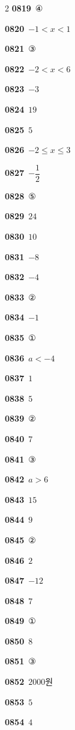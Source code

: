 \documentclass[10pt,a4paper]{article}
\begin{document}
\begin{multicols}{2}
\noindent\textbf{0819}\ ④\par
\noindent\textbf{0820}\ $-1<x<1$\par
\noindent\textbf{0821}\ ③\par
\noindent\textbf{0822}\ $-2<x<6$\par
\noindent\textbf{0823}\ $-3$\par
\noindent\textbf{0824}\ $19$\par
\noindent\textbf{0825}\ $5$\par
\noindent\textbf{0826}\ $-2\le x\le 3$\par
\noindent\textbf{0827}\ $-\dfrac{1}{2}$\par
\noindent\textbf{0828}\ ⑤\par
\noindent\textbf{0829}\ $24$\par
\noindent\textbf{0830}\ $10$\par
\noindent\textbf{0831}\ $-8$\par
\noindent\textbf{0832}\ $-4$\par
\noindent\textbf{0833}\ ②\par
\noindent\textbf{0834}\ $-1$\par
\noindent\textbf{0835}\ ①\par
\noindent\textbf{0836}\ $a<-4$\par
\noindent\textbf{0837}\ $1$\par
\noindent\textbf{0838}\ $5$\par
\noindent\textbf{0839}\ ②\par
\noindent\textbf{0840}\ $7$\par
\noindent\textbf{0841}\ ③\par
\noindent\textbf{0842}\ $a>6$\par
\noindent\textbf{0843}\ $15$\par
\noindent\textbf{0844}\ $9$\par
\noindent\textbf{0845}\ ②\par
\noindent\textbf{0846}\ $2$\par
\noindent\textbf{0847}\ $-12$\par
\noindent\textbf{0848}\ $7$\par
\noindent\textbf{0849}\ ①\par
\noindent\textbf{0850}\ $8$\par
\noindent\textbf{0851}\ ③\par
\noindent\textbf{0852}\ $2000$원\par
\noindent\textbf{0853}\ $5$\par
\noindent\textbf{0854}\ $4$\par

\end{multicols}
\end{document}
